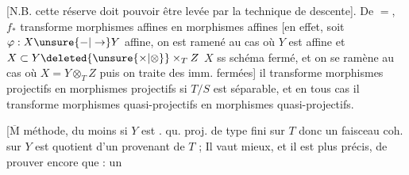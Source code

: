 

[N.B. cette réserve doit pouvoir être levée par la technique de descente]. De $=$,  $f_*$ transforme  morphismes affines en morphismes affines [en effet, soit $\varphi:X\unsure{-|\to}Y$ affine,  on est ramené  au cas où $Y$ est affine et $X\subset Y\deleted{\unsure{\times|\otimes}}\times_T Z$  $X$ ss schéma fermé,  et on se ramène au cas où $X=Y\mathbin{\otimes}_T Z$ puis on traite des imm. fermées] il transforme morphismes projectifs en morphismes projectifs si $T/S$ est séparable, et en tous cas il transforme morphismes quasi-projectifs en morphismes quasi-projectifs.

[$\overline{\mathrm M}$ méthode, du moins si  $Y$ est .  qu. proj. de type fini sur $T$ donc un faisceau coh. sur $Y$ est quotient d'un provenant de $T$ ; Il vaut mieux, et il est plus précis, de prouver encore que : un


